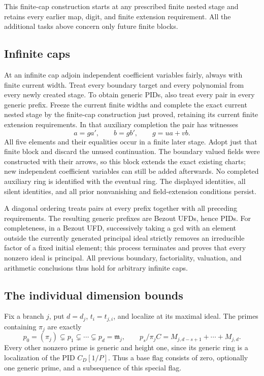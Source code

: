 \documentclass[11pt,reqno]{amsart}
\numberwithin{equation}{section}
\theoremstyle{plain}
\theoremstyle{definition}
\theoremstyle{remark}
\begin{document}
This finite-cap construction starts at any prescribed finite
nested stage and retains every earlier map, digit, and finite
extension requirement. All the additional tasks above concern
only future finite blocks.

\subsection{Infinite caps}

At an infinite cap adjoin independent coefficient variables
fairly, always with finite current width. Treat every boundary
target and every polynomial from every newly created stage.
To obtain generic PIDs, also treat every pair in every generic
prefix. Freeze the current finite widths and complete the
exact current nested stage by the finite-cap construction just
proved, retaining its current finite extension requirements.
In that auxiliary completion the pair has witnesses
\[
       a=ga',\qquad b=gb',\qquad g=ua+vb.
\]
All five elements and their equalities occur in a finite later
stage. Adopt just that finite block and discard the unused
continuation. The boundary valued fields were constructed with
their arrows, so this block extends the exact existing charts;
new independent coefficient variables can still be added
afterwards. No completed auxiliary ring is identified with
the eventual ring. The displayed identities, all silent
identities, and all prior nonvanishing and field-extension
conditions persist.

A diagonal ordering treats pairs at every prefix together with
all preceding requirements. The resulting generic prefixes are
Bezout UFDs, hence PIDs. For completeness, in a Bezout UFD,
successively taking a gcd with an element outside the currently
generated principal ideal strictly removes an irreducible
factor of a fixed initial element; this process terminates
and proves that every nonzero ideal is principal. All
previous boundary, factoriality, valuation, and arithmetic
conclusions thus hold for arbitrary infinite caps.

\subsection{The individual dimension bounds}

Fix a branch \(j\), put \(d=d_j\), \(t_i=t_{j,i}\), and
localize at its maximal ideal. The primes containing \(\pi_j\)
are exactly
\[
 p_0=(\pi_j)\subsetneq p_1\subsetneq\cdots
          \subsetneq p_d=\mathfrak m_j,\qquad
 p_s/\pi_jC=M_{j,d-s+1}+\cdots+M_{j,d}.
\]
Every other nonzero prime is generic and height one, since its
generic ring is a localization of the PID \(C_D[1/P]\).
Thus a base flag consists of zero, optionally one generic
prime, and a subsequence of this special flag.
\end{document}
